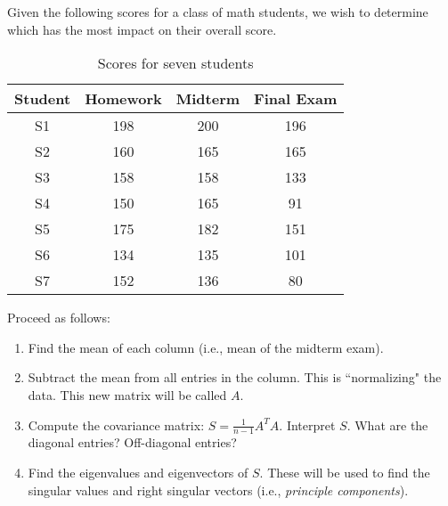 \begin{example}
Given the following scores for a class of math students, we wish to determine which has the most impact on their overall score.

\begin{table}[h]
\begin{center}
\begin{tabular}{cccc}
\toprule
\textbf{Student} & \textbf{Homework} & \textbf{Midterm} & \textbf{Final Exam} \\
\midrule
S1 & 198 & 200 & 196  \\
S2 & 160 & 165 & 165  \\
S3 & 158 & 158 & 133  \\
S4 & 150 & 165 & 91  \\
S5 & 175 & 182 & 151  \\
S6 & 134 & 135 & 101  \\
S7 & 152 & 136 & 80  \\
\bottomrule
\end{tabular}
\caption{Scores for seven students}
\end{center}

\label{default}
\end{table}%



Proceed as follows:

\begin{enumerate}
	\item Find the mean of each column (i.e., mean of the midterm exam).  
	
	\item Subtract the mean from all entries in the column.  This is ``normalizing" the data.  This new matrix will be called $A$.
	
	\item Compute the covariance matrix:  $S = \frac{1}{n-1} A^TA$.  Interpret $S$.  What are the diagonal entries?  Off-diagonal entries?
	
	\item Find the eigenvalues and eigenvectors of $S$.  These will be used to find the singular values and right singular vectors (i.e., \textit{principle components}).  
	
	
\end{enumerate}	
\end{example}

%
%
 

